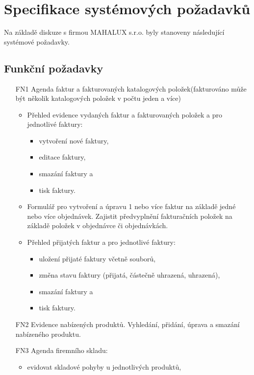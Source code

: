 \documentclass[thesis=B,czech]{FITthesis}[2012/06/26]
\begin{document}
\section{Specifikace systémových požadavků}

	Na základě diskuze s firmou MAHALUX s.r.o. byly stanoveny následující systémové požadavky.
	
\subsection{Funkční požadavky}

\begin{enumerate}
	\item[FN1] Agenda faktur a fakturovaných katalogových položek(fakturováno může být několik katalogových položek v počtu jeden a více)
	\begin{itemize}
		\item Přehled evidence vydaných faktur a fakturovaných položek a pro jednotlivé faktury:
		\begin{itemize}
			\item vytvoření nové faktury,
			\item editace faktury,
			\item smazání faktury a
			\item tisk faktury.
		\end{itemize}
		\item Formulář pro vytvoření a úpravu 1 nebo více faktur na základě jedné nebo více objednávek. Zajistit předvyplnění fakturačních položek na základě položek v objednávce či objednávkách.
		\item Přehled přijatých faktur a pro jednotlivé faktury:
		\begin{itemize}
			\item uložení přijaté faktury včetně souborů,
			\item změna stavu faktury (přijatá, částečně uhrazená, uhrazená),
			\item smazání faktury a
			\item tisk faktury.
		\end{itemize}
	\end{itemize}	
	\item[FN2] Evidence nabízených produktů.
	 	Vyhledání, přidání, úprava a smazání nabízeného produktu.
	\newpage
	\item[FN3] Agenda firemního skladu:
		\begin{itemize}
			\item evidovat skladové pohyby u jednotlivých produktů,

\end{itemize}
\end{enumerate}
\end{document}
